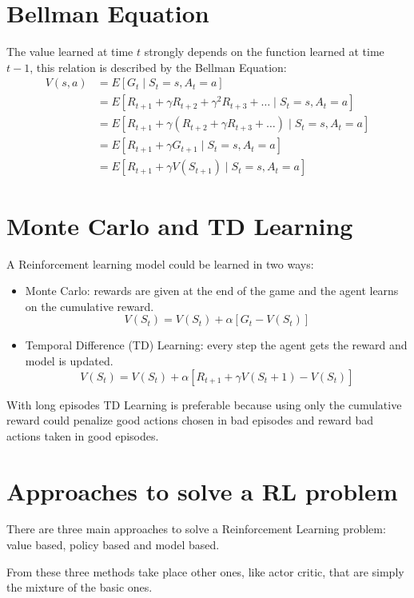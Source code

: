 \documentclass[Lau,oneside,noexaminfo]{sapthesis} %
\begin{document}
\section{Bellman Equation}
The value learned at time $t$ strongly depends on the function learned at time $t-1$, this relation is described by the Bellman Equation:
\begin{align}
V(s, a) &= E[G_t \mid S_t=s, A_t = a] \\
&= E[R_{t+1} + \gamma R_{t+2} + \gamma^2 R_{t+3} + \dots \mid S_t=s, A_t = a] \\
&= E[R_{t+1} + \gamma (R_{t+2} + \gamma R_{t+3} + \dots) \mid S_t=s, A_t = a] \\
&= E[R_{t+1} + \gamma G_{t+1} \mid S_t=s, A_t = a] \\
&= E[R_{t+1} + \gamma V(S_{t+1}) \mid S_t=s, A_t = a]
\end{align}
\section{Monte Carlo and TD Learning}
A Reinforcement learning model could be learned in two ways:
\begin{itemize}
	\item Monte Carlo: rewards are given at the end of the game and the agent learns on the cumulative reward.
	\begin{equation}
V( S_t ) = V( S_t ) + \alpha[ G_t - V(S_t) ]
	\end{equation}
	\item Temporal Difference (TD) Learning: every step the agent gets the reward and model is updated.
	\begin{equation}
V( S_t ) = V( S_t ) + \alpha[ R_{t+1} + \gamma V(S_t+1)- V(S_t) ]
	\end{equation}
\end{itemize}
With long episodes TD Learning is preferable because using only the cumulative reward could penalize good actions chosen in bad episodes and reward bad actions taken in good episodes.


\section{Approaches to solve a RL problem}
There are three main approaches to solve a Reinforcement Learning problem: value based, policy based and model based. 

From these three methods take place other ones, like actor critic, that are simply the mixture of the basic ones.
\end{document}
